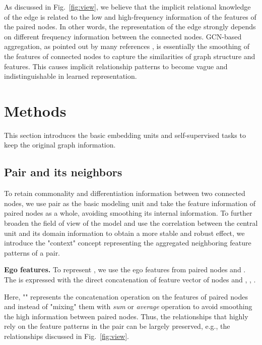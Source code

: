 \documentclass[10pt,journal,compsoc]{IEEEtran}
\begin{document}
As discussed in Fig.~\ref{fig:view}, we believe that the implicit relational knowledge of the edge is related to the low and high-frequency information of the features of the paired nodes. In other words, the representation of the edge strongly depends on different frequency information between the connected nodes. GCN-based aggregation, as pointed out by many references \cite{Zhu2020,wu2019simplifying}, is essentially the smoothing of the features of connected nodes\cite{Nt19} to capture the similarities of graph structure and features. This causes implicit relationship patterns to become vague and indistinguishable in learned representation.


\section{Methods}


This section introduces the basic embedding units and self-supervised tasks to keep the original graph information.

\subsection{Pair and its neighbors}

To retain commonality and differentiation information between two connected nodes, we use pair as the basic modeling unit and take the feature information of paired nodes as a whole, avoiding smoothing its internal information. To further broaden the field of view of the model and use the correlation between the central unit and its domain information to obtain a more stable and robust effect, we introduce the "context" concept representing the aggregated neighboring feature patterns of a pair. 



\noindent\textbf{Ego features.} To represent , we use the ego features from paired nodes  and . The  is expressed with the direct concatenation of feature vector of nodes  and , , . 

Here, "" represents the concatenation operation on the features of paired nodes  and  instead of "mixing" them with \textit{sum} or \textit{average} operation to avoid smoothing the high information between paired nodes. Thus, the relationships that highly rely on the feature patterns in the pair can be largely preserved, e.g., the relationships discussed in Fig.~\ref{fig:view}.
\end{document}
